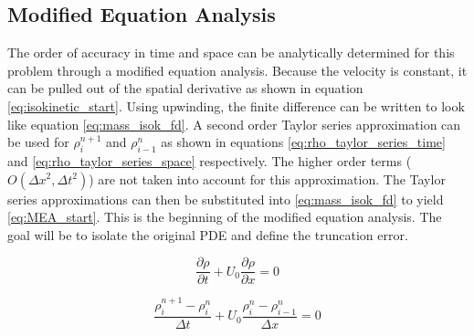 \documentclass{mc2015}
\begin{document}
%
%

\subsection{Modified Equation Analysis}
    
    
    The order of accuracy in time and space can be analytically determined for
    this problem through a modified equation analysis. Because the velocity is
    constant, it can be pulled out of the spatial derivative as shown in
    equation \ref{eq:isokinetic_start}. Using upwinding, the finite difference
    can be written to look like equation \ref{eq:mass_isok_fd}.  A second order
    Taylor series approximation can  be used for $\rho_{i}^{n+1}$  and
    $\rho_{i-1}^{n}$ as shown in equations \ref{eq:rho_taylor_series_time} and
    \ref{eq:rho_taylor_series_space} respectively. The higher order terms
    ($O(\Delta x^{2},\Delta t^{2} )$) are not taken into account for this
    approximation. The Taylor series approximations can then be substituted into
    \ref{eq:mass_isok_fd} to yield \ref{eq:MEA_start}. This is the beginning of
    the modified equation analysis. The goal will be to isolate the original PDE
    and define the truncation error.
    
    \begin{equation}
    	\label{eq:isokinetic_start}
    	\frac{\partial \rho}{\partial t} + U_{0} \frac{\partial \rho}{\partial x} = 0
    \end{equation}
    
    \begin{equation}
    	\label{eq:mass_isok_fd}
    	\frac{ \rho_{i}^{n+1} - \rho_{i}^{n} }{\Delta t} 
    	+ U_{0} \frac{\rho_{i}^{n} - \rho_{i-1}^{n}}{\Delta x} = 0
    \end{equation}
    
\end{document}
